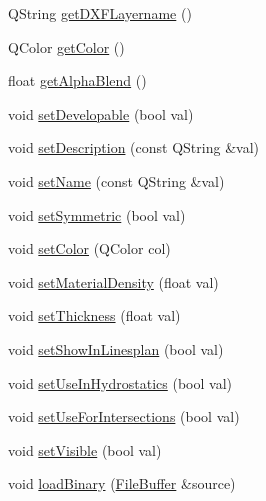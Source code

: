 \begin{DoxyCompactItemize}
Q\-String \hyperlink{classShipCADGeometry_1_1SubdivisionLayer_a52e6b9f53d989156e073d5fdc820c968}{get\-D\-X\-F\-Layername} ()
\item 
Q\-Color \hyperlink{classShipCADGeometry_1_1SubdivisionLayer_aa1a348600f3ceea5b28569c683d445a5}{get\-Color} ()
\item 
float \hyperlink{classShipCADGeometry_1_1SubdivisionLayer_a34d50c0f49578ecfe8f228bc8d52be6f}{get\-Alpha\-Blend} ()
\item 
void \hyperlink{classShipCADGeometry_1_1SubdivisionLayer_a6fdfc0d208904d821349eb7380a52411}{set\-Developable} (bool val)
\item 
void \hyperlink{classShipCADGeometry_1_1SubdivisionLayer_a3e81d07f92749d57d84688b038f60946}{set\-Description} (const Q\-String \&val)
\item 
void \hyperlink{classShipCADGeometry_1_1SubdivisionLayer_a3861c77aeb283fbea6efe943ced83f41}{set\-Name} (const Q\-String \&val)
\item 
void \hyperlink{classShipCADGeometry_1_1SubdivisionLayer_ab3c7c5072ba6cd411404651e8e0dca2f}{set\-Symmetric} (bool val)
\item 
void \hyperlink{classShipCADGeometry_1_1SubdivisionLayer_a5494031433242c810e6e307bfef33e6d}{set\-Color} (Q\-Color col)
\item 
void \hyperlink{classShipCADGeometry_1_1SubdivisionLayer_adceba3b277753b6b289745480ace9854}{set\-Material\-Density} (float val)
\item 
void \hyperlink{classShipCADGeometry_1_1SubdivisionLayer_a49eeb096434aa4b1ab37eb8f14cee896}{set\-Thickness} (float val)
\item 
void \hyperlink{classShipCADGeometry_1_1SubdivisionLayer_aa58323da0043db61eaa87672755e96d2}{set\-Show\-In\-Linesplan} (bool val)
\item 
void \hyperlink{classShipCADGeometry_1_1SubdivisionLayer_a88897eeb2b600169ca110fc4ec4aef08}{set\-Use\-In\-Hydrostatics} (bool val)
\item 
void \hyperlink{classShipCADGeometry_1_1SubdivisionLayer_aef63325b0ef8b700b96a7cd97c501936}{set\-Use\-For\-Intersections} (bool val)
\item 
void \hyperlink{classShipCADGeometry_1_1SubdivisionLayer_a979723de5c5cf0f4ecea8a5f9d0968d7}{set\-Visible} (bool val)
\item 
void \hyperlink{classShipCADGeometry_1_1SubdivisionLayer_a060357b84c0549fa7310e45680fed9bd}{load\-Binary} (\hyperlink{classShipCADGeometry_1_1FileBuffer}{File\-Buffer} \&source)
\item 

\end{DoxyCompactItemize}

